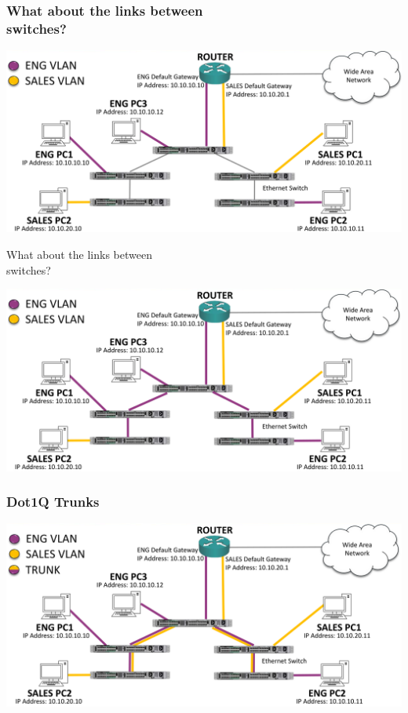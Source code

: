 \documentclass[pdflatex,compress,mathserif]{beamer}
\begin{document}
\begin{frame}
	\frametitle{What about the links between\\ switches?}
	\begin{center}
		\includegraphics[width=\linewidth]{img/img19}
	\end{center}
\end{frame}

\begin{frame}{What about the links between\\ switches?}
	\begin{center}
		\includegraphics[width=\linewidth]{img/img20}
	\end{center}
\end{frame}

\begin{frame}
	\frametitle{Dot1Q Trunks}
	\begin{center}
		\includegraphics[width=\linewidth]{img/img21}
	\end{center}
\end{frame}
\end{document}
